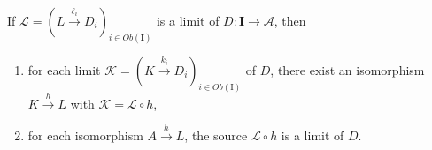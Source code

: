 \begin{prop}[Uniqueness]
If $\mathcal{L}=\left(L \xrightarrow{\ell_i} D_i\right)_{i \in O b(\mathbf{I})}$ is a limit of $D: \mathbf{I} \rightarrow \mathcal{A}$, then
    \begin{enumerate}
        \item for each limit $\mathcal{K}=\left(K \xrightarrow{k_i} D_i\right)_{i \in O b(\mathrm{I})}$ of $D$, there exist an isomorphism $K \xrightarrow{h} L$ with $\mathcal{K}=\mathcal{L} \circ h$,
        \item for each isomorphism $A \xrightarrow{h} L$, the source $\mathcal{L} \circ h$ is a limit of $D$.
    \end{enumerate}
\end{prop}





